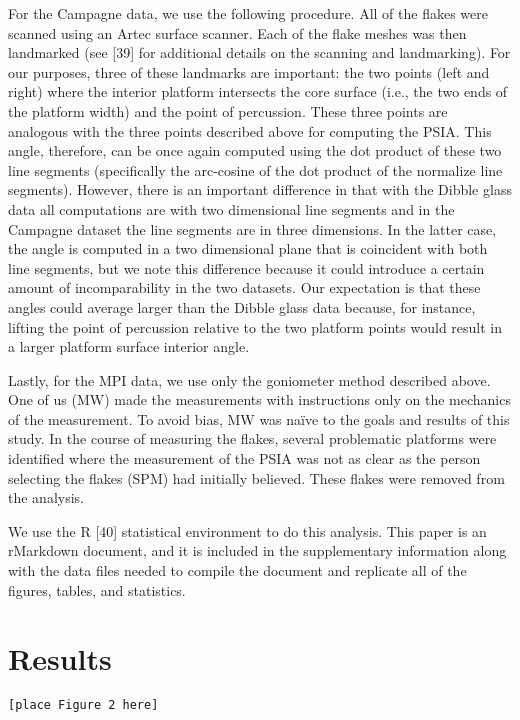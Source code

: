 \documentclass[10pt,letterpaper]{article}
\begin{document}
For the Campagne data, we use the following procedure. All of the flakes
were scanned using an Artec surface scanner. Each of the flake meshes
was then landmarked (see {[}39{]} for additional details on the scanning
and landmarking). For our purposes, three of these landmarks are
important: the two points (left and right) where the interior platform
intersects the core surface (i.e., the two ends of the platform width)
and the point of percussion. These three points are analogous with the
three points described above for computing the PSIA. This angle,
therefore, can be once again computed using the dot product of these two
line segments (specifically the arc-cosine of the dot product of the
normalize line segments). However, there is an important difference in
that with the Dibble glass data all computations are with two
dimensional line segments and in the Campagne dataset the line segments
are in three dimensions. In the latter case, the angle is computed in a
two dimensional plane that is coincident with both line segments, but we
note this difference because it could introduce a certain amount of
incomparability in the two datasets. Our expectation is that these
angles could average larger than the Dibble glass data because, for
instance, lifting the point of percussion relative to the two platform
points would result in a larger platform surface interior angle.

Lastly, for the MPI data, we use only the goniometer method described
above. One of us (MW) made the measurements with instructions only on
the mechanics of the measurement. To avoid bias, MW was naïve to the
goals and results of this study. In the course of measuring the flakes,
several problematic platforms were identified where the measurement of
the PSIA was not as clear as the person selecting the flakes (SPM) had
initially believed. These flakes were removed from the analysis.

We use the R {[}40{]} statistical environment to do this analysis. This
paper is an rMarkdown document, and it is included in the supplementary
information along with the data files needed to compile the document and
replicate all of the figures, tables, and statistics.

\hypertarget{results}{%
\section{Results}\label{results}}

\begin{verbatim}
[place Figure 2 here]
\end{verbatim}
\end{document}
